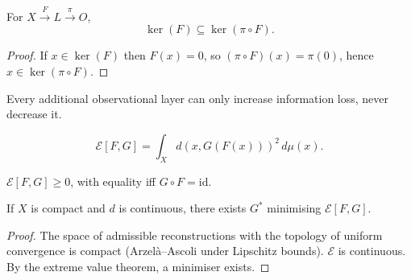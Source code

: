 \begin{theorem}
  \label{thm:proj-composition}
  For $X \xrightarrow{F} L \xrightarrow{\pi} O$,
  \[
    \ker(F) \subseteq \ker(\pi \circ F).
  \]
\end{theorem}

\begin{proof}
  If $x \in \ker(F)$ then $F(x) = 0$, so
  $(\pi\circ F)(x) = \pi(0)$, hence $x \in \ker(\pi\circ F)$.
\end{proof}

\begin{corollary}
  Every additional observational layer can only increase
  information loss, never decrease it.
\end{corollary}

\begin{definition}
  \[
    \mathcal{E}[F,G]
    = \int_X d(x, G(F(x)))^2\, d\mu(x).
  \]
\end{definition}

\begin{proposition}
  $\mathcal{E}[F,G] \geq 0$, with equality iff $G \circ F = \mathrm{id}$.
\end{proposition}

\begin{theorem}
  \label{thm:optimal-recon}
  \statusproven{}
  If $X$ is compact and $d$ is continuous, there exists
  $G^*$ minimising $\mathcal{E}[F,G]$.
\end{theorem}

\begin{proof}
  The space of admissible reconstructions with the topology
  of uniform convergence is compact (Arzelà--Ascoli under
  Lipschitz bounds).
  $\mathcal{E}$ is continuous.
  By the extreme value theorem, a minimiser exists.
\end{proof}
